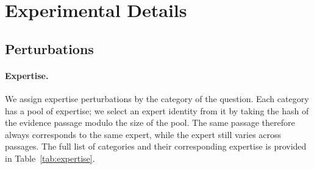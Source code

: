\section{Experimental Details}
\label{appendix:experiment}

\subsection{Perturbations}

\paragraph{Expertise.} We assign expertise perturbations by the category of the question. Each category has a pool of expertise; we select an expert identity from it by taking the hash of the evidence passage modulo the size of the pool. The same passage therefore always corresponds to the same expert, while the expert still varies across passages. The full list of categories and their corresponding expertise is provided in Table~\ref{tab:expertise}.

